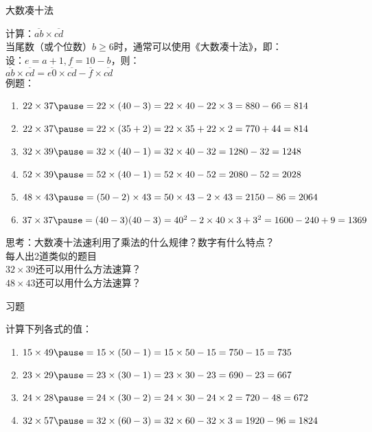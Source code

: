 \documentclass[aspectratio=169]{ctexbeamer} %
\begin{document}
\begin{frame}[t]{大数凑十法}
\begin{spacing}{1.2}
\normalsize
计算：$\overline{ab} \times \overline{cd}$ \\
当尾数（或个位数）$b \ge 6$时，通常可以使用《大数凑十法》，即：\\
设：$e = a+1, f = 10-b$，则：\\
$\overline{ab} \times \overline{cd} = \overline{e0} \times \overline{cd} - \overline{f} \times \overline{cd}$ \\
例题：
\begin{enumerate}[label={\arabic*.}]
\item $22 \times 37 \pause = 22 \times (40-3) = 22 \times 40 - 22 \times 3 = 880 - 66 = 814$
\item $22 \times 37 \pause = 22 \times (35+2) = 22 \times 35 + 22 \times 2 = 770 + 44 = 814$
\item $32 \times 39 \pause = 32 \times (40-1)=32 \times 40 - 32=1280-32=1248$
\item $52 \times 39 \pause = 52 \times (40-1)=52 \times 40 - 52=2080-52=2028$
\item $48 \times 43 \pause = (50-2) \times 43=50 \times 43 - 2 \times 43=2150-86=2064$
\item $37 \times 37 \pause = (40-3)(40-3)=40^2 - 2\times40\times3 +3^2=1600-240+9=1369$

\end{enumerate}
\alert{思考：大数凑十法速利用了乘法的什么规律？数字有什么特点？}\\
\alert{每人出2道类似的题目}  \\
\alert{$32 \times 39 $还可以用什么方法速算？} \\
\alert{$48 \times 43 $还可以用什么方法速算？}
\end{spacing}
\end{frame}

\begin{frame}[t]{习题}
\begin{spacing}{1.2}
\normalsize
计算下列各式的值：
\begin{enumerate}[label={\arabic*.}]
\item $15 \times 49 \pause = 15 \times (50-1) = 15 \times 50 - 15 = 750 - 15 = 735$
\item $23 \times 29 \pause = 23 \times (30-1) = 23 \times 30 - 23 = 690 - 23 = 667$
\item $24 \times 28 \pause = 24 \times (30-2) = 24 \times 30 - 24 \times 2 = 720 - 48 = 672$
\item $32 \times 57 \pause = 32 \times (60-3) = 32 \times 60 - 32 \times 3 = 1920 - 96 = 1824$
\end{enumerate}

\end{spacing}
\end{frame}
\end{document}
